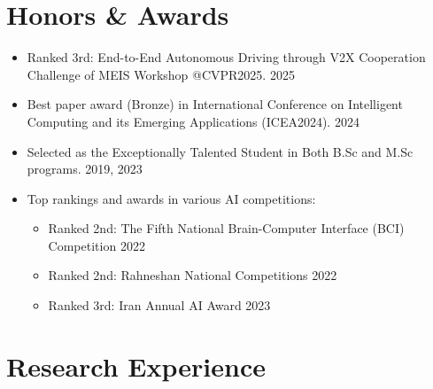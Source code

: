 \documentclass[10pt, letterpaper]{article}
\begin{document}
        
    
    \section*{\textcolor{primaryColor}{Honors \& Awards}}
    \small
    \begin{itemize}[leftmargin=0.8cm, itemsep=0pt] %
        \item Ranked 3rd: End-to-End Autonomous Driving through V2X Cooperation Challenge of MEIS Workshop @CVPR2025. \hfill 2025
        
        \item Best paper award (Bronze) in International Conference on Intelligent Computing and its Emerging Applications (ICEA2024). \hfill 2024
        
        \item Selected as the Exceptionally Talented Student in Both B.Sc and M.Sc programs. \hfill 2019, 2023

        \item Top rankings and awards in various AI competitions:
        \vspace{-0.1cm} %
        \begin{itemize}[leftmargin=1.2cm, itemsep=0pt] %
            \small %
            \item Ranked 2nd: The Fifth National Brain-Computer Interface (BCI) Competition \hfill 2022
            \item Ranked 2nd: Rahneshan National Competitions \hfill 2022
            \item Ranked 3rd: Iran Annual AI Award \hfill 2023
        \end{itemize}

    \end{itemize}


    \section*{\textcolor{primaryColor}{Research Experience}}
        
\end{document}
